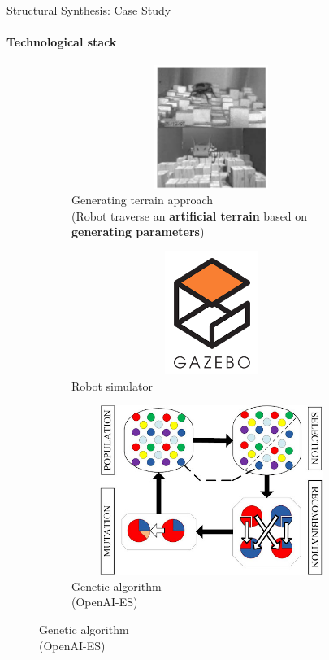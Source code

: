\documentclass[aspectratio=169]{beamer}
\begin{document}
\begin{frame}[c]{Structural Synthesis: Case Study}
    \framesubtitle{Technological stack}
    \vspace{-0.9cm}
    \begin{figure}[H]
        \begin{subfigure}[t]{0.32\textwidth}
            \centering\includegraphics[height=4cm,width=1\textwidth,keepaspectratio]{c1_paper.png}
            \caption*{\small Generating terrain approach \\ (Robot traverse an \textbf{artificial terrain} based on \textbf{generating parameters})}
        \end{subfigure}
        \hfill
        \begin{subfigure}[t]{0.32\textwidth}
            \centering\includegraphics[height=4cm,width=1\textwidth,keepaspectratio]{gazebo_logo.png}
            \caption*{Robot simulator}
        \end{subfigure}
        \hfill
        \begin{subfigure}[t]{0.32\textwidth}
            \centering\includegraphics[height=5.5cm,width=1\textwidth,keepaspectratio]{gen_algo.jpg}
            \caption*{Genetic algorithm \\ (OpenAI-ES)}
        \end{subfigure}
        \hfill
    \end{figure}
\end{frame}
\end{document}
